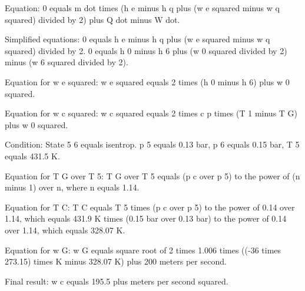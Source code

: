 Equation: 
0 equals m dot times (h e minus h q plus (w e squared minus w q squared) divided by 2) plus Q dot minus W dot.

Simplified equations:
0 equals h e minus h q plus (w e squared minus w q squared) divided by 2.
0 equals h 0 minus h 6 plus (w 0 squared divided by 2) minus (w 6 squared divided by 2).

Equation for w e squared:
w e squared equals 2 times (h 0 minus h 6) plus w 0 squared.

Equation for w c squared:
w c squared equals 2 times c p times (T 1 minus T G) plus w 0 squared.

Condition:
State 5 6 equals isentrop.
p 5 equals 0.13 bar, p 6 equals 0.15 bar, T 5 equals 431.5 K.

Equation for T G over T 5:
T G over T 5 equals (p c over p 5) to the power of (n minus 1) over n, where n equals 1.14.

Equation for T C:
T C equals T 5 times (p c over p 5) to the power of 0.14 over 1.14, which equals 431.9 K times (0.15 bar over 0.13 bar) to the power of 0.14 over 1.14, which equals 328.07 K.

Equation for w G:
w G equals square root of 2 times 1.006 times ((-36 times 273.15) times K minus 328.07 K) plus 200 meters per second.

Final result:
w c equals 195.5 plus meters per second squared.